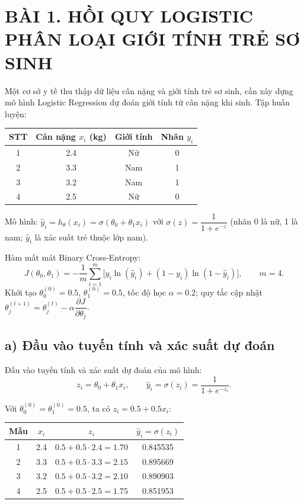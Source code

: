 \documentclass[a4paper,12pt]{article}
\begin{document}
\newpage
\section*{BÀI 1. HỒI QUY LOGISTIC PHÂN LOẠI GIỚI TÍNH TRẺ SƠ SINH}

Một cơ sở y tế thu thập dữ liệu cân nặng và giới tính trẻ sơ sinh, cần xây dựng mô hình
Logistic Regression dự đoán giới tính từ cân nặng khi sinh. Tập huấn luyện:

\begin{center}
\begin{tabular}{|c|c|c|c|}
\hline
STT & Cân nặng $x_i$ (kg) & Giới tính & Nhãn $y_i$ \\
\hline
1 & 2.4 & Nữ & 0 \\
2 & 3.3 & Nam & 1 \\
3 & 3.2 & Nam & 1 \\
4 & 2.5 & Nữ & 0 \\
\hline
\end{tabular}
\end{center}

Mô hình: $\hat{y}_i = h_\theta(x_i) = \sigma(\theta_0 + \theta_1 x_i)$ với
$\sigma(z) = \dfrac{1}{1+e^{-z}}$ (nhãn 0 là nữ, 1 là nam; $\hat{y}_i$ là xác suất trẻ
thuộc lớp nam).

Hàm mất mát Binary Cross-Entropy:
\[ J(\theta_0,\theta_1) = -\frac{1}{m}\sum_{i=1}^{m}\bigl[y_i\ln(\hat{y}_i) + (1-y_i)\ln(1-\hat{y}_i)\bigr],
\qquad m = 4. \]
Khởi tạo $\theta_0^{(0)} = 0.5$, $\theta_1^{(0)} = 0.5$, tốc độ học $\alpha = 0.2$;
quy tắc cập nhật $\theta_j^{(t+1)} = \theta_j^{(t)} - \alpha\dfrac{\partial J}{\partial\theta_j}$.

\subsection*{a) Đầu vào tuyến tính và xác suất dự đoán}

Đầu vào tuyến tính và xác suất dự đoán của mô hình:
\[ z_i = \theta_0 + \theta_1 x_i, \qquad \hat{y}_i = \sigma(z_i) = \frac{1}{1+e^{-z_i}}. \]

Với $\theta_0^{(0)} = \theta_1^{(0)} = 0.5$, ta có $z_i = 0.5 + 0.5x_i$:
\begin{center}
\begin{tabular}{|c|c|c|c|}
\hline
Mẫu & $x_i$ & $z_i$ & $\hat{y}_i = \sigma(z_i)$ \\
\hline
1 & 2.4 & $0.5+0.5\cdot 2.4 = 1.70$ & 0.845535 \\
2 & 3.3 & $0.5+0.5\cdot 3.3 = 2.15$ & 0.895669 \\
3 & 3.2 & $0.5+0.5\cdot 3.2 = 2.10$ & 0.890903 \\
4 & 2.5 & $0.5+0.5\cdot 2.5 = 1.75$ & 0.851953 \\
\hline
\end{tabular}
\end{center}
\end{document}
